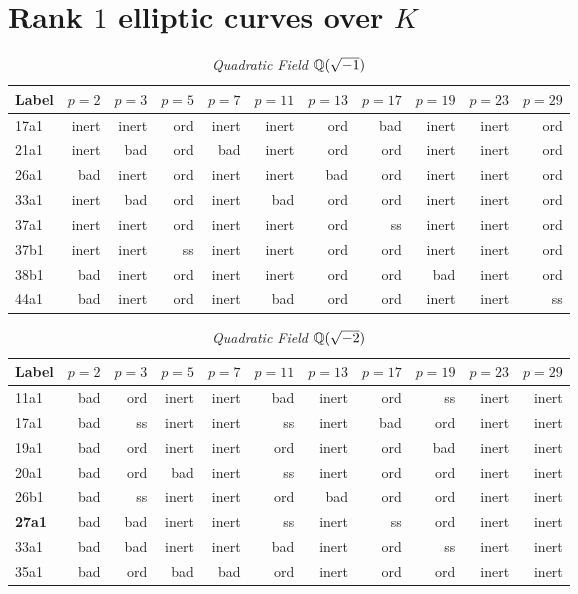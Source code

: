 \documentclass[a4paper,11pt]{article}
\numberwithin{equation}{section}
\begin{document}
\section{Rank $1$ elliptic curves over $K$}

\begin{table}[H]	\caption{\label{table:ordinary}\emph{Quadratic Field $\mathbb{Q}(\sqrt{-1})$}}
\begin{tabular}[t]{lrrrrrrrrrr}
	\toprule
Label   &  $p=2$ & $p=3$ & $p=5$ & $p=7$ & $p=11$ & $p=13$ & $p=17$ & $p=19$ & $p=23$ & $p=29$

\\ \midrule 17a1&inert&inert&ord&inert&inert&ord&bad &inert&inert&ord\\ \midrule 21a1&inert&bad &ord&bad &inert&ord&ord&inert&inert&ord\\ \midrule 26a1&bad &inert&ord&inert&inert&bad &ord&inert&inert&ord\\ \midrule 33a1&inert&bad &ord&inert&bad &ord&ord&inert&inert&ord\\ \midrule 37a1&inert&inert&ord&inert&inert&ord&ss&inert&inert&ord\\ \midrule 37b1&inert&inert&ss&inert&inert&ord&ord&inert&inert&ord\\ \midrule 38b1&bad &inert&ord&inert&inert&ord&ord&bad &inert&ord\\ \midrule 44a1&bad &inert&ord&inert&bad &ord&ord&inert&inert&ss

\\
\bottomrule
\end{tabular}
\end{table}


\begin{table}[H]	\caption{\label{table:ordinary}\emph{Quadratic Field $\mathbb{Q}(\sqrt{-2})$}}
\begin{tabular}[t]{lrrrrrrrrrr}
	\toprule
Label   &  $p=2$ & $p=3$ & $p=5$ & $p=7$ & $p=11$ & $p=13$ & $p=17$ & $p=19$ & $p=23$ & $p=29$

\\ \midrule 11a1&bad &ord&inert&inert&bad &inert&ord&ss&inert&inert\\ \midrule 17a1&bad &ss&inert&inert&ss&inert&bad &ord&inert&inert\\ \midrule 19a1&bad &ord&inert&inert&ord&inert&ord&bad &inert&inert\\ \midrule 20a1&bad &ord&bad &inert&ss&inert&ord&ord&inert&inert\\ \midrule 26b1&bad &ss&inert&inert&ord&bad &ord&ord&inert&inert\\ \midrule \textbf{27a1} &bad &bad &inert&inert&ss&inert&ss&ord&inert&inert\\ \midrule 33a1&bad &bad &inert&inert&bad &inert&ord&ss&inert&inert\\ \midrule 35a1&bad &ord&bad &bad &ord&inert&ord&ord&inert&inert

\\
\bottomrule
\end{tabular}
\end{table}
\end{document}
